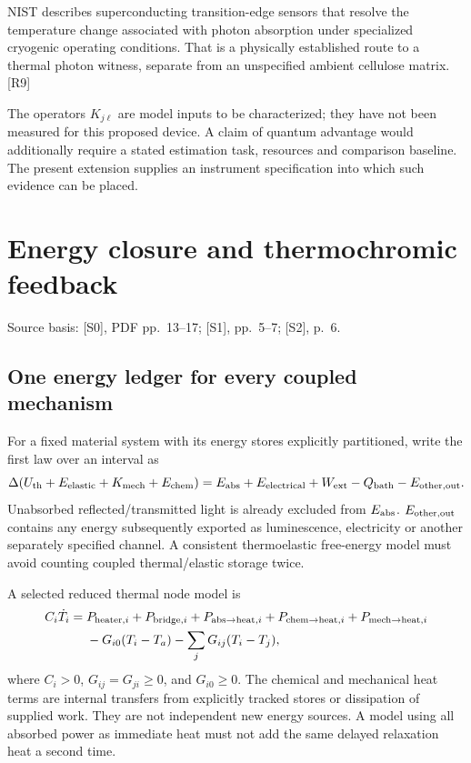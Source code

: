 \documentclass[10pt,a4paper]{article}
\numberwithin{equation}{section}
\newcommand{\src}[1]{\textcolor{muted}{\footnotesize Source basis: #1.}}
\newcommand{\newpart}{\clearpage}
\begin{document}
NIST describes superconducting transition-edge sensors that resolve the temperature change associated with photon absorption under specialized cryogenic operating conditions. That is a physically established route to a thermal photon witness, separate from an unspecified ambient cellulose matrix. [R9]

The operators $K_{j\ell}$ are model inputs to be characterized; they have not been measured for this proposed device. A claim of quantum advantage would additionally require a stated estimation task, resources and comparison baseline. The present extension supplies an instrument specification into which such evidence can be placed.

\newpart
\section{Energy closure and thermochromic feedback}
\label{sec:thermal}
\src{[S0], PDF pp.~13--17; [S1], pp.~5--7; [S2], p.~6}

\subsection*{One energy ledger for every coupled mechanism}
For a fixed material system with its energy stores explicitly partitioned, write the first law over an interval as
\begin{equation}
\Delta(U_{\rm th}+E_{\rm elastic}+K_{\rm mech}+E_{\rm chem})
=E_{\rm abs}+E_{\rm electrical}+W_{\rm ext}-Q_{\rm bath}-E_{\rm other,out}.
\end{equation}
Unabsorbed reflected/transmitted light is already excluded from $E_{\rm abs}$. $E_{\rm other,out}$ contains any energy subsequently exported as luminescence, electricity or another separately specified channel. A consistent thermoelastic free-energy model must avoid counting coupled thermal/elastic storage twice.

A selected reduced thermal node model is
\begin{align}
C_i\dot T_i={}&P_{{\rm heater},i}+P_{{\rm bridge},i}+P_{{\rm abs\to heat},i}
+P_{{\rm chem\to heat},i}+P_{{\rm mech\to heat},i}\notag\\
&-G_{i0}(T_i-T_a)-\sum_jG_{ij}(T_i-T_j),
\label{eq:thermal}
\end{align}
where $C_i>0$, $G_{ij}=G_{ji}\ge0$, and $G_{i0}\ge0$. The chemical and mechanical heat terms are internal transfers from explicitly tracked stores or dissipation of supplied work. They are not independent new energy sources. A model using all absorbed power as immediate heat must not add the same delayed relaxation heat a second time.
\end{document}
